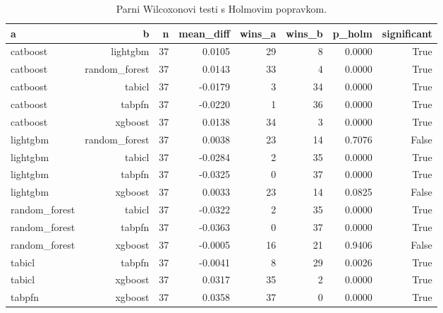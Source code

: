 \begin{table}[htbp]
\centering
\caption{Parni Wilcoxonovi testi s Holmovim popravkom.}
\label{tab:wilcoxon-nonsaturated}
\begin{tabular}{lrrrrrrr}
\hline
a & b & n & mean\_diff & wins\_a & wins\_b & p\_holm & significant \\
\hline
catboost & lightgbm & 37 & 0.0105 & 29 & 8 & 0.0000 & True \\
catboost & random\_forest & 37 & 0.0143 & 33 & 4 & 0.0000 & True \\
catboost & tabicl & 37 & -0.0179 & 3 & 34 & 0.0000 & True \\
catboost & tabpfn & 37 & -0.0220 & 1 & 36 & 0.0000 & True \\
catboost & xgboost & 37 & 0.0138 & 34 & 3 & 0.0000 & True \\
lightgbm & random\_forest & 37 & 0.0038 & 23 & 14 & 0.7076 & False \\
lightgbm & tabicl & 37 & -0.0284 & 2 & 35 & 0.0000 & True \\
lightgbm & tabpfn & 37 & -0.0325 & 0 & 37 & 0.0000 & True \\
lightgbm & xgboost & 37 & 0.0033 & 23 & 14 & 0.0825 & False \\
random\_forest & tabicl & 37 & -0.0322 & 2 & 35 & 0.0000 & True \\
random\_forest & tabpfn & 37 & -0.0363 & 0 & 37 & 0.0000 & True \\
random\_forest & xgboost & 37 & -0.0005 & 16 & 21 & 0.9406 & False \\
tabicl & tabpfn & 37 & -0.0041 & 8 & 29 & 0.0026 & True \\
tabicl & xgboost & 37 & 0.0317 & 35 & 2 & 0.0000 & True \\
tabpfn & xgboost & 37 & 0.0358 & 37 & 0 & 0.0000 & True \\
\hline
\end{tabular}
\end{table}
